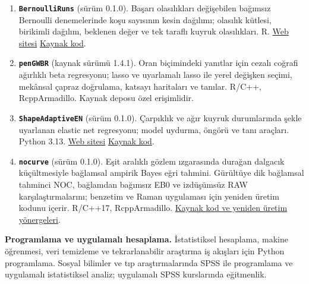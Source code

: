 \documentclass[10pt,a4paper]{article}
\newenvironment{etaremune}{\begin{enumerate}}{\end{enumerate}}
\begin{document}
\begin{etaremune}
\item \textbf{\texttt{BernoulliRuns}} (sürüm 0.1.0). Başarı olasılıkları değişebilen bağımsız Bernoulli denemelerinde koşu sayısının kesin dağılımı; olasılık kütlesi, birikimli dağılım, beklenen değer ve tek taraflı kuyruk olasılıkları. R. \href{https://byuzbasi.github.io/BernoulliRuns/}{Web sitesi} \textbar{} \href{https://github.com/byuzbasi/BernoulliRuns}{Kaynak kod}.

\item \textbf{\texttt{penGWBR}} (kaynak sürümü 1.4.1). Oran biçimindeki yanıtlar için cezalı coğrafi ağırlıklı beta regresyonu; lasso ve uyarlamalı lasso ile yerel değişken seçimi, mekânsal çapraz doğrulama, katsayı haritaları ve tanılar. R/C++, RcppArmadillo. Kaynak deposu özel erişimlidir.

\item \textbf{\texttt{ShapeAdaptiveEN}} (sürüm 0.1.0). Çarpıklık ve ağır kuyruk durumlarında şekle uyarlanan elastic net regresyonu; model uydurma, öngörü ve tanı araçları. Python 3.13. \href{https://byuzbasi.github.io/shape-adaptive-robust-regression/}{Web sitesi} \textbar{} \href{https://github.com/byuzbasi/shape-adaptive-robust-regression}{Kaynak kod}.

\item \textbf{\texttt{nocurve}} (sürüm 0.1.0). Eşit aralıklı gözlem ızgarasında durağan dalgacık küçültmesiyle bağlamsal ampirik Bayes eğri tahmini. Gürültüye dik bağlamsal tahminci NOC, bağlamdan bağımsız EB0 ve izdüşümsüz RAW karşılaştırmalarını; benzetim ve Raman uygulaması için yeniden üretim kodunu içerir. R/C++17, RcppArmadillo. \href{https://github.com/byuzbasi/nocurve}{Kaynak kod ve yeniden üretim yönergeleri}.

\end{etaremune}

\smallskip
\noindent\textbf{Programlama ve uygulamalı hesaplama.} İstatistiksel hesaplama, makine öğrenmesi, veri temizleme ve tekrarlanabilir araştırma iş akışları için Python programlama. Sosyal bilimler ve tıp araştırmalarında SPSS ile programlama ve uygulamalı istatistiksel analiz; uygulamalı SPSS kurslarında eğitmenlik.
\end{document}
